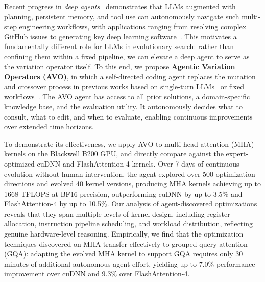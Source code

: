 Recent progress in \emph{deep agents}~\citep{jimenez2024swebench, yang2024sweagent, wang2024openhands, anthropic2025cc, openai2025codex} demonstrates that LLMs augmented with planning, persistent memory, and tool use can autonomously navigate such multi-step engineering workflows, with applications ranging from resolving complex GitHub issues to generating key deep learning software~\citep{xu2026vibetensor}.
This motivates a fundamentally different role for LLMs in evolutionary search: rather than confining them within a fixed pipeline, we can elevate a deep agent to serve as the variation operator itself.
To this end, we propose \textbf{Agentic Variation Operators (AVO)}, in which a self-directed coding agent replaces the mutation and crossover process in previous works based on single-turn LLMs~\citep{funsearch2024, alphaevolve2025, chen2023evoprompting} or fixed workflows~\citep{wan2025loongflow}.
The AVO agent has access to all prior solutions, a domain-specific knowledge base, and the evaluation utility.
It autonomously decides what to consult, what to edit, and when to evaluate, enabling continuous improvements over extended time horizons.

To demonstrate its effectiveness, we apply AVO to multi-head attention (MHA) kernels on the Blackwell B200 GPU, and directly compare against the expert-optimized cuDNN and FlashAttention-4 kernels.
Over 7 days of continuous evolution without human intervention, the agent explored over 500 optimization directions and evolved 40 kernel versions, producing MHA kernels achieving up to 1668 TFLOPS at BF16 precision, outperforming cuDNN by up to 3.5\% and FlashAttention-4 by up to 10.5\%.
Our analysis of agent-discovered optimizations reveals that they span multiple levels of kernel design, including register allocation, instruction pipeline scheduling, and workload distribution, reflecting genuine hardware-level reasoning.
Empirically, we find that the optimization techniques discovered on MHA transfer effectively to grouped-query attention (GQA): adapting the evolved MHA kernel to support GQA requires only 30 minutes of additional autonomous agent effort, yielding up to 7.0\% performance improvement over cuDNN and 9.3\% over FlashAttention-4.



